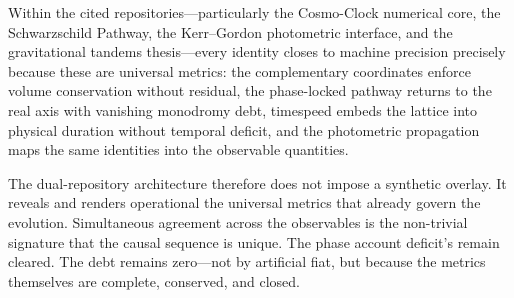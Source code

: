 Within the cited repositories—particularly the Cosmo-Clock numerical core, the Schwarzschild Pathway, the Kerr–Gordon photometric interface, and the gravitational tandems thesis—every identity closes to machine precision precisely because these are universal metrics: the complementary coordinates enforce volume conservation without residual, the phase-locked pathway returns to the real axis with vanishing monodromy debt, timespeed embeds the lattice into physical duration without temporal deficit, and the photometric propagation maps the same identities into the observable quantities.

The dual-repository architecture therefore does not impose a synthetic overlay. It reveals and renders operational the universal metrics that already govern the evolution. Simultaneous agreement across the observables is the non-trivial signature that the causal sequence is unique. The phase account deficit's remain cleared. The debt remains zero—not by artificial fiat, but because the metrics themselves are complete, conserved, and closed.
